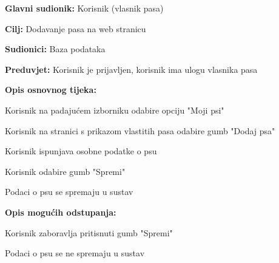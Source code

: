 					\noindent {}
					\begin{packed_item}
						
						\item \textbf{Glavni sudionik: } Korisnik (vlasnik pasa)
						\item  \textbf{Cilj:} Dodavanje pasa na web stranicu
						\item  \textbf{Sudionici:} Baza podataka 
						\item  \textbf{Preduvjet:} Korisnik je prijavljen, korisnik ima ulogu vlasnika pasa
						\item  \textbf{Opis osnovnog tijeka:}
						
						\item[] \begin{packed_enum}
							
							\item Korisnik na padajućem izborniku odabire opciju "Moji psi" 
							\item Korisnik na stranici s prikazom vlastitih pasa odabire gumb "Dodaj psa"
							\item Korisnik ispunjava osobne podatke o psu
							\item Korisnik odabire gumb "Spremi"
							\item Podaci o psu se spremaju u sustav
							
						\end{packed_enum}
					
				
						\item  \textbf{Opis mogućih odstupanja:}
		
						\item[] \begin{packed_item}
	
							\item[4.a] Korisnik zaboravlja pritisnuti gumb "Spremi"
							\item[] \begin{packed_enum}
								\item Podaci o psu se ne spremaju u sustav
							\end{packed_enum}
						\end{packed_item}
					\end{packed_item}
					
